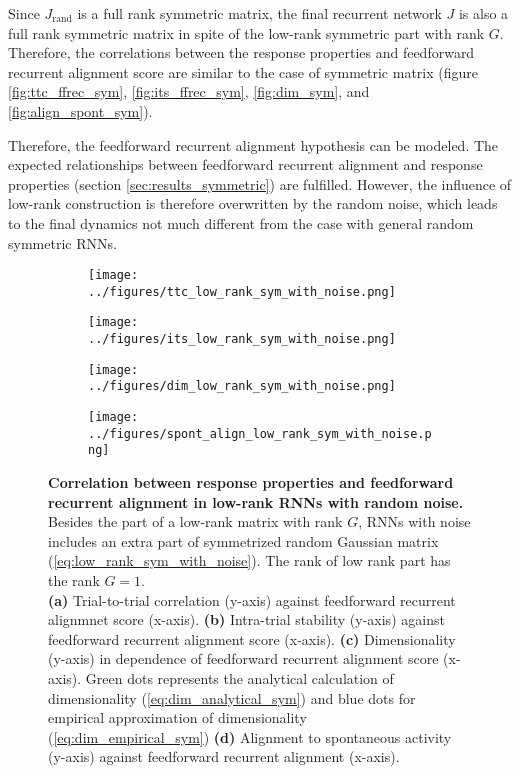 \documentclass[11pt]{article}
\begin{document}
	Since $J_{\text{rand}}$ is a full rank symmetric matrix, the final recurrent network $J$ is also a full rank symmetric matrix in spite of the low-rank symmetric part with rank $G$. Therefore, the correlations between the response properties and feedforward recurrent alignment score are similar to the case of symmetric matrix (figure \ref{fig:ttc_ffrec_sym}, \ref{fig:its_ffrec_sym}, \ref{fig:dim_sym}, and \ref{fig:align_spont_sym}). 
	
	Therefore, the feedforward recurrent alignment hypothesis can be modeled. The expected relationships between feedforward recurrent alignment and response properties (section \ref{sec:results_symmetric}) are fulfilled. However, the influence of low-rank construction is therefore overwritten by the random noise, which leads to the final dynamics not much different from the case with general random symmetric RNNs. 
		\begin{figure}[H]
			\centering
			\begin{subfigure}[b]{0.45\textwidth}
				\centering
				\texttt{[image: ../figures/ttc\_low\_rank\_sym\_with\_noise.png]}
				\caption{}
			\end{subfigure}
			\begin{subfigure}[b]{0.45\textwidth}
				\centering
				\texttt{[image: ../figures/its\_low\_rank\_sym\_with\_noise.png]}
				\caption{}
			\end{subfigure}
			\newline
			\begin{subfigure}[b]{0.45\textwidth}
				\centering
				\texttt{[image: ../figures/dim\_low\_rank\_sym\_with\_noise.png]}
				\caption{}
			\end{subfigure}
			\begin{subfigure}[b]{0.45\textwidth}
				\centering
				\texttt{[image: ../figures/spont\_align\_low\_rank\_sym\_with\_noise.png]}
				\caption{}
			\end{subfigure}
		\caption{\textbf{Correlation between response properties and feedforward recurrent alignment in low-rank RNNs with random noise.} Besides the part of a low-rank matrix with rank $G$, RNNs with noise includes an extra part of symmetrized random Gaussian matrix (\ref{eq:low_rank_sym_with_noise}). The rank of low rank part has the rank $G=1$.\\
		\textbf{(a)} Trial-to-trial correlation (y-axis) against feedforward recurrent alignmnet score (x-axis). \textbf{(b)} Intra-trial stability (y-axis) against feedforward recurrent alignment score (x-axis). \textbf{(c)} Dimensionality (y-axis) in dependence of feedforward recurrent alignment score (x-axis). Green dots represents the analytical calculation of dimensionality (\ref{eq:dim_analytical_sym}) and blue dots for empirical approximation of dimensionality (\ref{eq:dim_empirical_sym}) \textbf{(d)} Alignment to spontaneous activity (y-axis) against feedforward recurrent alignment (x-axis).}
		\end{figure}
\end{document}
